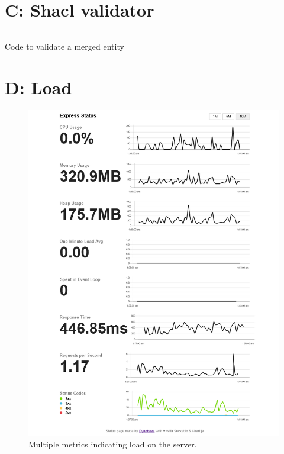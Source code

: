 \begin{appendices}
\section*{C: Shacl validator}
\begin{listing}[H]
\inputminted[frame=single,linenos,breaklines]{TypeScript}{code/shacl.ts}
\caption{Code to validate a merged entity}
\label{code:shacl:validator}
\end{listing}

\section*{D: Load}
\begin{figure}[H]
    \centering
    \includegraphics[width=\textwidth]{images/load.png}
    \caption{Multiple metrics indicating load on the server. }
    \label{fig:load}
\end{figure}


\end{appendices}

